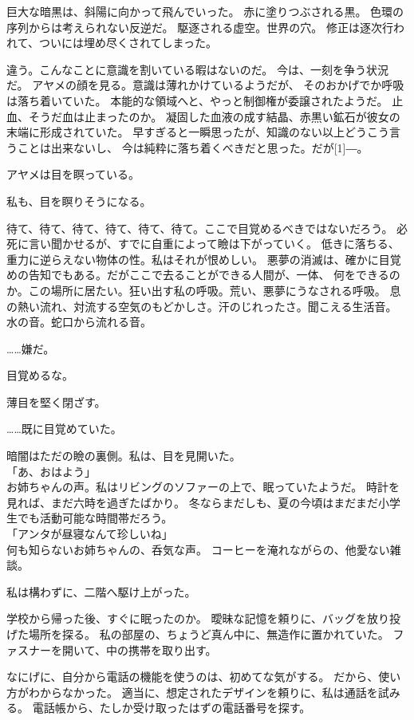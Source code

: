\documentclass[../IHMain]{subfiles}
\begin{document}
巨大な暗黒は、斜陽に向かって飛んでいった。
赤に塗りつぶされる黒。
色環の序列からは考えられない反逆だ。
駆逐される虚空。世界の穴。
修正は逐次行われて、ついには埋め尽くされてしまった。

違う。こんなことに意識を割いている暇はないのだ。
今は、一刻を争う状況だ。
アヤメの顔を見る。意識は薄れかけているようだが、
そのおかげでか呼吸は落ち着いていた。
本能的な領域へと、やっと制御権が委譲されたようだ。
止血、そうだ血は止まったのか。
凝固した血液の成す結晶、赤黒い鉱石が彼女の末端に形成されていた。
早すぎると一瞬思ったが、知識のない以上どうこう言うことは出来ないし、
今は純粋に落ち着くべきだと思った。だが\scalebox{3}[1]{―}。

アヤメは目を瞑っている。

私も、目を瞑りそうになる。

待て、待て、待て、待て、待て、待て。ここで目覚めるべきではないだろう。
必死に言い聞かせるが、すでに自重によって瞼は下がっていく。
低きに落ちる、重力に逆らえない物体の性。私はそれが恨めしい。
悪夢の消滅は、確かに目覚めの告知でもある。だがここで去ることができる人間が、一体、
何をできるのか。この場所に居たい。狂い出す私の呼吸。荒い、悪夢にうなされる呼吸。
息の熱い流れ、対流する空気のもどかしさ。汗のじれったさ。聞こえる生活音。
水の音。蛇口から流れる音。

……嫌だ。

目覚めるな。

薄目を堅く閉ざす。

……既に目覚めていた。

暗闇はただの瞼の裏側。私は、目を見開いた。\\

「あ、おはよう」\\
お姉ちゃんの声。私はリビングのソファーの上で、眠っていたようだ。
時計を見れば、まだ六時を過ぎたばかり。
冬ならまだしも、夏の今頃はまだまだ小学生でも活動可能な時間帯だろう。\\
「アンタが昼寝なんて珍しいね」\\
何も知らないお姉ちゃんの、呑気な声。
コーヒーを淹れながらの、他愛ない雑談。

私は構わずに、二階へ駆け上がった。

学校から帰った後、すぐに眠ったのか。
曖昧な記憶を頼りに、バッグを放り投げた場所を探る。
私の部屋の、ちょうど真ん中に、無造作に置かれていた。
ファスナーを開いて、中の携帯を取り出す。

なにげに、自分から電話の機能を使うのは、初めてな気がする。
だから、使い方がわからなかった。
適当に、想定されたデザインを頼りに、私は通話を試みる。
電話帳から、たしか受け取ったはずの電話番号を探す。
\end{document}
